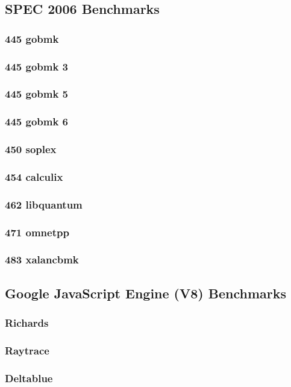 \documentclass[onecolumn, openany, master, english, seal, signatures]{dbrgrptt}
\begin{document}
\subsection{SPEC 2006 Benchmarks \cite{henning2006spec}}
\subsubsection{445 gobmk}
\subsubsection{445 gobmk 3}
\subsubsection{445 gobmk 5}
\subsubsection{445 gobmk 6}
\subsubsection{450 soplex}
\subsubsection{454 calculix}
\subsubsection{462 libquantum}
\subsubsection{471 omnetpp}
\subsubsection{483 xalancbmk}

\subsection{Google JavaScript Engine (V8) Benchmarks}
\subsubsection{Richards}
\subsubsection{Raytrace}
\subsubsection{Deltablue}
\end{document}
